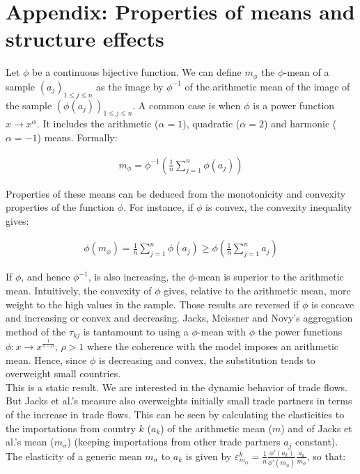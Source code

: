 \documentclass{article}
\begin{document}
\section{\label{A2}Appendix: Properties of means and structure effects}


Let $\phi$ be a continuous bijective function. We can define
$m_{\phi}$ the $\phi$-mean of a sample $(a_j)_{1\leq j\leq n}$
as the image by $\phi^{-1}$ of the arithmetic mean of the image
of the sample $(\phi(a_j))_{1\leq j\leq n}$. A common case is
when $\phi$ is a power function $x \rightarrow x^\alpha$. It
includes the arithmetic ($\alpha=1$), quadratic ($\alpha=2$)
and harmonic ($\alpha=-1$) means. Formally:

\begin{eqnarray*}
m_{\phi}=\phi^{-1}\left(\frac{1}{n}\sum_{j=1}^n \phi(a_j)\right)
\end{eqnarray*}

Properties of these means can be deduced from the monotonicity
and convexity properties of the function $\phi$. For instance,
if $\phi$ is convex, the convexity inequality gives:

\begin{eqnarray*}
\phi(m_{\phi})=\frac{1}{n}\sum_{j=1}^n\phi(a_j)\geq \phi\left(\frac{1}{n}\sum_{j=1}^n
a_j\right)
\end{eqnarray*}

If $\phi$, and hence $\phi^{-1}$, is also increasing, the
$\phi$-mean is superior to the arithmetic mean. Intuitively,
the convexity of $\phi$ gives, relative to the arithmetic mean,
more weight to the high values in the sample. Those results are
reversed if $\phi$ is concave and increasing or convex and
decreasing. Jacks, Meissner and Novy's aggregation method of
the $\tau_{kj}$ is tantamount to using a $\phi$-mean with
$\phi$ the power functions $\phi: x \rightarrow
x^{\frac{1}{1-\rho}}$, $\rho>1$ where the coherence with the
model imposes an arithmetic mean. Hence, since $\phi$ is
decreasing and convex, the substitution tends to overweight
small countries.\\

This is a static result. We are interested in the dynamic
behavior of trade flows. But Jacks et al.'s measure also
overweights initially small trade partners in terms of the
increase in trade flows. This can be seen by calculating the
elasticities to the importations from country $k$ ($a_k$) of
the arithmetic mean ($m$) and of Jacks et al.'s mean
($m_{\sigma}$) (keeping importations from other trade partners
$a_j$ constant). The elasticity of a generic mean $m_\sigma$ to
$a_k$ is given by
\mbox{$\varepsilon_{m_{\phi}}^k=\frac{1}{n}\frac{\phi'(a_k)}{\phi'(m_{\phi})}\frac{a_k}{m_{\phi}}$},
so that:
\end{document}
